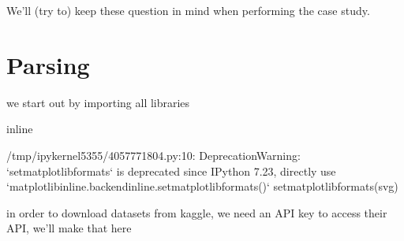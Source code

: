 \documentclass[letterpaper,10pt,english]{jupyterBook}
\begin{document}
\sphinxAtStartPar
We’ll (try to) keep these question in mind when performing the case study.


\section{Parsing}
\label{\detokenize{c7_case_studies/Churn:parsing}}
\sphinxAtStartPar
we start out by importing all libraries

\begin{sphinxVerbatim}[commandchars=\\\{\}]
 
 
   
   
   
 
   
   
 inline
\end{sphinxVerbatim}

\begin{sphinxVerbatim}[commandchars=\\\{\}]
/tmp/ipykernel\PYGZus{}5355/4057771804.py:10: DeprecationWarning: `set\PYGZus{}matplotlib\PYGZus{}formats` is deprecated since IPython 7.23, directly use `matplotlib\PYGZus{}inline.backend\PYGZus{}inline.set\PYGZus{}matplotlib\PYGZus{}formats()`
  set\PYGZus{}matplotlib\PYGZus{}formats(\PYGZsq{}svg\PYGZsq{})
\end{sphinxVerbatim}

\sphinxAtStartPar
in order to download datasets from kaggle, we need an API key to access their API, we’ll make that here
\end{document}
